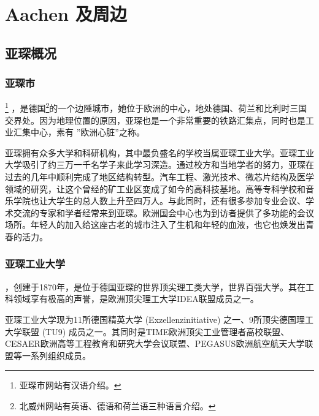 
\chapter{Aachen 及周边}\label{chap:Aachen 及周边}

\section{亚琛概况}\label{sec:亚琛概况}

  \subsection{亚琛市}\label{subsec:亚琛市}

    \href{https://www.aachen.de/CHIN/kurzinfo.html}{}\footnote{亚琛市网站有汉语介绍。} ，是德国\href{https://www.land.nrw}{}\footnote{北威州网站有英语、德语和荷兰语三种语言介绍。}的一个边陲城市，她位于欧洲的中心，地处德国、荷兰和比利时三国交界处。因为地理位置的原因，亚琛也是一个非常重要的铁路汇集点，同时也是工业汇集中心，素有 ”欧洲心脏”之称。

    亚琛拥有众多大学和科研机构，其中最负盛名的学校当属亚琛工业大学。亚琛工业大学吸引了约三万一千名学子来此学习深造。通过校方和当地学者的努力，亚琛在过去的几年中顺利完成了地区结构转型。汽车工程、激光技术、微芯片结构及医学领域的研究，让这个曾经的矿工业区变成了如今的高科技基地。高等专科学校和音乐学院也让大学生的总人数上升至四万人。与此同时，还有很多参加专业会议、学术交流的专家和学者经常来到亚琛。欧洲国会中心也为到访者提供了多功能的会议场所。年轻人的加入给这座古老的城市注入了生机和年轻的血液，也它也焕发出青春的活力。

  \subsection{亚琛工业大学}\label{subsec:亚琛工业大学}

    \href{https://www.rwth-aachen.de/go/id/a/?lidx=1}{}，创建于1870年，是位于德国亚琛的世界顶尖理工类大学，世界百强大学。其在工科领域享有极高的声誉，是欧洲顶尖理工大学IDEA联盟成员之一。

    亚琛工业大学现为11所德国精英大学 (Exzellenzinitiative) 之一、9所顶尖德国理工大学联盟 (TU9) 成员之一。其同时是TIME欧洲顶尖工业管理者高校联盟、CESAER欧洲高等工程教育和研究大学会议联盟、PEGASUS欧洲航空航天大学联盟等一系列组织成员。

